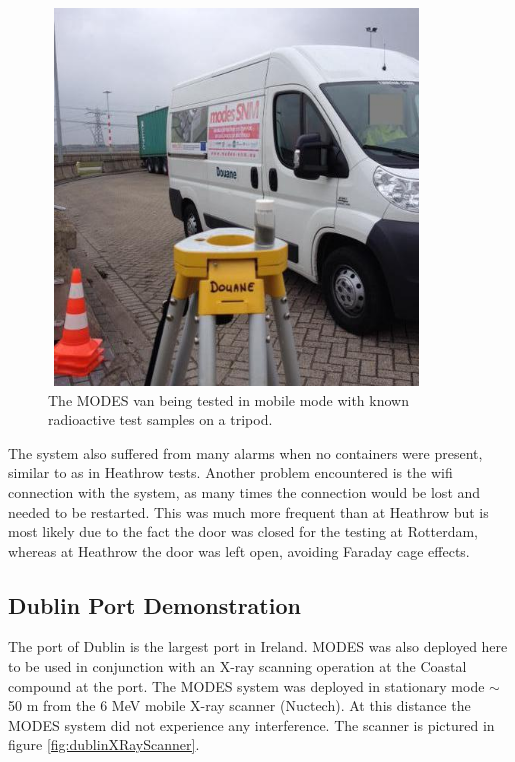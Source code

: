 \begin{figure}
\begin{center}
\includegraphics[width=100mm,height=100mm]{./Chapter7/figures/rotterdamTripodTest.jpg}
\end{center}
\caption{The MODES van being tested in mobile mode with known radioactive test samples on a tripod.}
\label{fig:rotterdamTripod}
\end{figure}

The system also suffered from many alarms when no containers were present, similar to as in Heathrow tests. Another problem encountered is the wifi connection with the system, as many times the connection would be lost and needed to be restarted. This was much more frequent than at Heathrow but is most likely due to the fact the door was closed for the testing at Rotterdam, whereas at Heathrow the door was left open, avoiding Faraday cage effects.

\subsection{Dublin Port Demonstration}
The port of Dublin is the largest port in Ireland. MODES was also deployed here to be used in conjunction with an X-ray scanning operation at the Coastal compound at the port. The MODES system was deployed in stationary mode $\sim$50 m from the 6 MeV mobile X-ray scanner (Nuctech). At this distance the MODES system did not experience any interference. The scanner is pictured in figure \ref{fig:dublinXRayScanner}.
 
